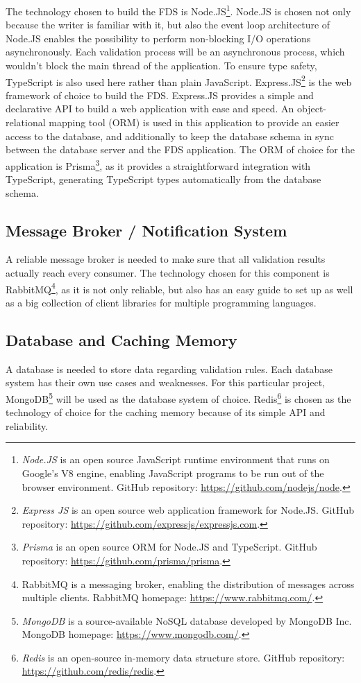  The technology chosen to build the FDS is Node.JS\footnote{\emph{Node.JS} is an open source JavaScript runtime environment that runs on Google's V8 engine, enabling JavaScript programs to be run out of the browser environment. GitHub repository: \url{https://github.com/nodejs/node}.}. Node.JS is chosen not only because the writer is familiar with it, but also the event loop architecture of Node.JS enables the possibility to perform non-blocking I/O operations asynchronously. Each validation process will be an asynchronous process, which wouldn't block the main thread of the application. To ensure type safety, TypeScript is also used here rather than plain JavaScript. Express.JS\footnote{\emph{Express JS} is an open source web application framework for Node.JS. GitHub repository: \url{https://github.com/expressjs/expressjs.com}.} is the web framework of choice to build the FDS. Express.JS provides a simple and declarative API to build a web application with ease and speed.
An object-relational mapping tool (ORM) is used in this application to provide an easier access to the database, and additionally to keep the database schema in sync between the database server and the FDS application. The ORM of choice for the application is Prisma\footnote{\emph{Prisma} is an open source ORM for Node.JS and TypeScript. GitHub repository: \url{https://github.com/prisma/prisma}.}, as it provides a straightforward integration with TypeScript, generating TypeScript types automatically from the database schema.

 \subsection{Message Broker / Notification System}
 A reliable message broker is needed to make sure that all validation results actually reach every consumer. The technology chosen for this component is RabbitMQ\footnote{RabbitMQ is a messaging broker, enabling the distribution of messages across multiple clients. RabbitMQ homepage: \url{https://www.rabbitmq.com/}.}, as it is not only reliable, but also has an easy guide to set up as well as a big collection of client libraries for multiple programming languages.

 \subsection{Database and Caching Memory}
 A database is needed to store data regarding validation rules. Each database system has their own use cases and weaknesses. For this particular project, MongoDB\footnote{\emph{MongoDB} is a source-available NoSQL database developed by MongoDB Inc. MongoDB homepage: \url{https://www.mongodb.com/}.} will be used as the database system of choice. Redis\footnote{\emph{Redis} is an open-source in-memory data structure store. GitHub repository: \url{https://github.com/redis/redis}.} is chosen as the technology of choice for the caching memory because of its simple API and reliability. 